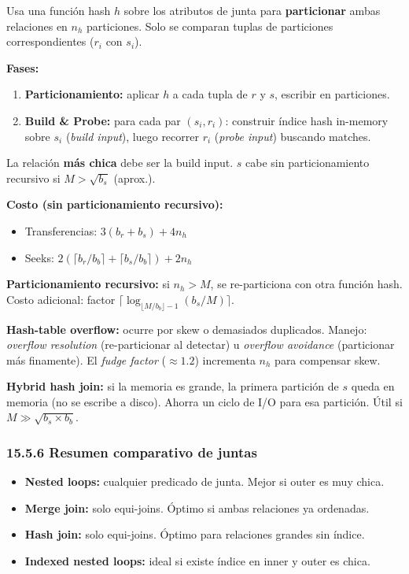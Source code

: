 \documentclass[11pt, a4paper]{article}
\begin{document}
Usa una función hash $h$ sobre los atributos de junta para \textbf{particionar} ambas relaciones en $n_h$ particiones. Solo se comparan tuplas de particiones correspondientes ($r_i$ con $s_i$).

\textbf{Fases:}
\begin{enumerate}[nosep]
	\item \textbf{Particionamiento:} aplicar $h$ a cada tupla de $r$ y $s$, escribir en particiones.
	\item \textbf{Build \& Probe:} para cada par $(s_i, r_i)$: construir índice hash in-memory sobre $s_i$ (\textit{build input}), luego recorrer $r_i$ (\textit{probe input}) buscando matches.
\end{enumerate}

La relación \textbf{más chica} debe ser la build input. $s$ cabe sin particionamiento recursivo si $M > \sqrt{b_s}$ (aprox.).

\textbf{Costo (sin particionamiento recursivo):}
\begin{itemize}[nosep]
	\item Transferencias: $3(b_r + b_s) + 4 n_h$
	\item Seeks: $2(\lceil b_r / b_b \rceil + \lceil b_s / b_b \rceil) + 2 n_h$
\end{itemize}

\textbf{Particionamiento recursivo:} si $n_h > M$, se re-particiona con otra función hash. Costo adicional: factor $\lceil \log_{\lfloor M/b_b \rfloor - 1}(b_s/M) \rceil$.

\textbf{Hash-table overflow:} ocurre por skew o demasiados duplicados. Manejo: \textit{overflow resolution} (re-particionar al detectar) u \textit{overflow avoidance} (particionar más finamente). El \textit{fudge factor} ($\approx 1.2$) incrementa $n_h$ para compensar skew.

\textbf{Hybrid hash join:} si la memoria es grande, la primera partición de $s$ queda en memoria (no se escribe a disco). Ahorra un ciclo de I/O para esa partición. Útil si $M \gg \sqrt{b_s \times b_b}$.

\subsubsection{15.5.6 Resumen comparativo de juntas}

\begin{itemize}[nosep]
	\item \textbf{Nested loops:} cualquier predicado de junta. Mejor si outer es muy chica.
	\item \textbf{Merge join:} solo equi-joins. Óptimo si ambas relaciones ya ordenadas.
	\item \textbf{Hash join:} solo equi-joins. Óptimo para relaciones grandes sin índice.
	\item \textbf{Indexed nested loops:} ideal si existe índice en inner y outer es chica.
\end{itemize}
\end{document}
